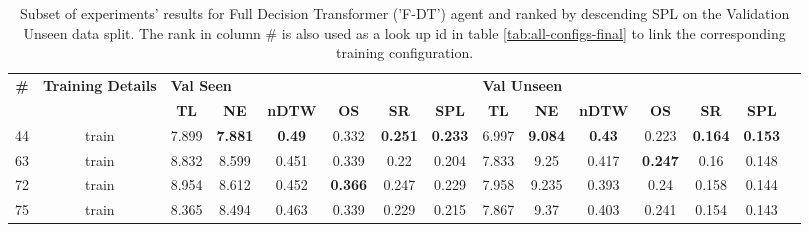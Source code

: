 \begin{table}
\centering
\caption{\label{tab:f_dt_full_dt_ablation_dim}Subset of experiments' results for Full Decision Transformer ('F-DT') agent and ranked by descending SPL on the Validation Unseen data split. The rank in column \# is also used as a look up id in table \ref{tab:all-configs-final} to link the corresponding training configuration.}
\begin{tabular}{@{\hskip3pt}c@{\hskip3pt}c@{\hskip3pt}c@{\hskip3pt}c@{\hskip3pt}c@{\hskip3pt}c@{\hskip3pt}c@{\hskip3pt}c@{\hskip3pt}c@{\hskip3pt}c@{\hskip3pt}c@{\hskip3pt}c@{\hskip3pt}c@{\hskip3pt}c@{\hskip3pt}c}
\toprule
\textbf{\#} & \textbf{Training Details} & \multicolumn{6}{l}{\textbf{Val Seen}} & \multicolumn{6}{l}{\textbf{Val Unseen}} \\
 \textbf{~} &                \textbf{~} &       \textbf{TL} &     \textbf{NE} &  \textbf{nDTW} &     \textbf{OS} &     \textbf{SR} &    \textbf{SPL} &         \textbf{TL} &     \textbf{NE} &  \textbf{nDTW} &     \textbf{OS} &     \textbf{SR} &    \textbf{SPL} \\
\midrule
         44 &                     train &             7.899 &  \textbf{7.881} &  \textbf{0.49} &           0.332 &  \textbf{0.251} &  \textbf{0.233} &               6.997 &  \textbf{9.084} &  \textbf{0.43} &           0.223 &  \textbf{0.164} &  \textbf{0.153} \\
         63 &                     train &             8.832 &           8.599 &          0.451 &           0.339 &            0.22 &           0.204 &               7.833 &            9.25 &          0.417 &  \textbf{0.247} &            0.16 &           0.148 \\
         72 &                     train &             8.954 &           8.612 &          0.452 &  \textbf{0.366} &           0.247 &           0.229 &               7.958 &           9.235 &          0.393 &            0.24 &           0.158 &           0.144 \\
         75 &                     train &             8.365 &           8.494 &          0.463 &           0.339 &           0.229 &           0.215 &               7.867 &            9.37 &          0.403 &           0.241 &           0.154 &           0.143 \\
\bottomrule
\end{tabular}
\end{table}
